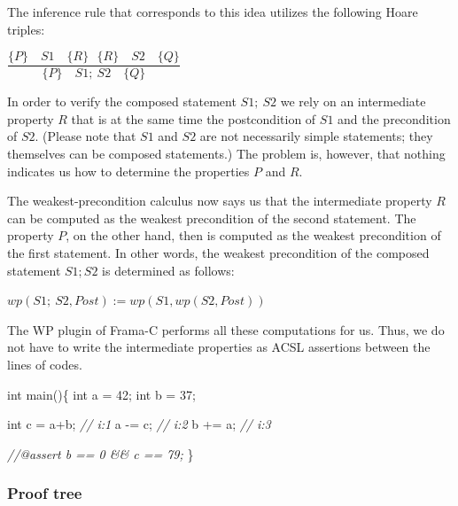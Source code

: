 \documentclass[12pt,francais,]{scrbook}
\newenvironment{Shaded}{}{}
\newcommand{\DataTypeTok}[1]{\textcolor[rgb]{0.56,0.13,0.00}{{#1}}}
\newcommand{\DecValTok}[1]{\textcolor[rgb]{0.25,0.63,0.44}{{#1}}}
\newcommand{\CommentTok}[1]{\textcolor[rgb]{0.38,0.63,0.69}{\textit{{#1}}}}
\newcommand{\NormalTok}[1]{{#1}}
\begin{document}
\clearpage
The inference rule that corresponds to this idea utilizes the following
Hoare triples:

\begin{center}
\(\dfrac{\{P\}\quad S1 \quad \{R\} \ \ \ \{R\}\quad S2 \quad \{Q\}}{\{P\}\quad S1 ;\ S2 \quad \{Q\}}\)
\end{center}

In order to verify the composed statement \(S1;\ S2\) we rely on an
intermediate property \(R\) that is at the same time the postcondition
of \(S1\) and the precondition of \(S2\). (Please note that \(S1\) and
\(S2\) are not necessarily simple statements; they themselves can be
composed statements.) The problem is, however, that nothing indicates us
how to determine the properties \(P\) and \(R\).

The weakest-precondition calculus now says us that the intermediate
property \(R\) can be computed as the weakest precondition of the second
statement. The property \(P\), on the other hand, then is computed as
the weakest precondition of the first statement. In other words, the
weakest precondition of the composed statement \(S1; S2\) is determined
as follows:

\begin{center} \(wp(S1;\ S2 , Post) := wp(S1, wp(S2, Post) )\)
\end{center}

The WP plugin of Frama-C performs all these computations for us. Thus,
we do not have to write the intermediate properties as ACSL assertions
between the lines of codes.

\begin{footnotesize}\begin{Shaded}
\begin{Highlighting}[]
\DataTypeTok{int} \NormalTok{main()\{}
  \DataTypeTok{int} \NormalTok{a = }\DecValTok{42}\NormalTok{;}
  \DataTypeTok{int} \NormalTok{b = }\DecValTok{37}\NormalTok{;}

  \DataTypeTok{int} \NormalTok{c = a+b; }\CommentTok{// i:1}
  \NormalTok{a -= c;      }\CommentTok{// i:2}
  \NormalTok{b += a;      }\CommentTok{// i:3}

  \CommentTok{//@assert b == 0 && c == 79;}
\NormalTok{\}}
\end{Highlighting}
\end{Shaded}\end{footnotesize}

\subsubsection{Proof tree}\label{proof-tree}
\end{document}
